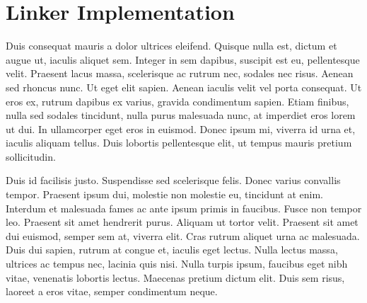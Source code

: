 \section{Linker Implementation}
Duis consequat mauris a dolor ultrices eleifend. Quisque nulla est, dictum et augue ut, iaculis aliquet sem. Integer in sem dapibus, suscipit est eu, pellentesque velit. Praesent lacus massa, scelerisque ac rutrum nec, sodales nec risus. Aenean sed rhoncus nunc. Ut eget elit sapien. Aenean iaculis velit vel porta consequat. Ut eros ex, rutrum dapibus ex varius, gravida condimentum sapien. Etiam finibus, nulla sed sodales tincidunt, nulla purus malesuada nunc, at imperdiet eros lorem ut dui. In ullamcorper eget eros in euismod. Donec ipsum mi, viverra id urna et, iaculis aliquam tellus. Duis lobortis pellentesque elit, ut tempus mauris pretium sollicitudin.

Duis id facilisis justo. Suspendisse sed scelerisque felis. Donec varius convallis tempor. Praesent ipsum dui, molestie non molestie eu, tincidunt at enim. Interdum et malesuada fames ac ante ipsum primis in faucibus. Fusce non tempor leo. Praesent sit amet hendrerit purus. Aliquam ut tortor velit. Praesent sit amet dui euismod, semper sem at, viverra elit. Cras rutrum aliquet urna ac malesuada. Duis dui sapien, rutrum at congue et, iaculis eget lectus. Nulla lectus massa, ultrices ac tempus nec, lacinia quis nisi. Nulla turpis ipsum, faucibus eget nibh vitae, venenatis lobortis lectus. Maecenas pretium dictum elit. Duis sem risus, laoreet a eros vitae, semper condimentum neque.
